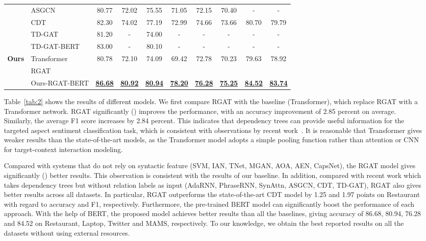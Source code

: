 \documentclass[journal]{IEEEtran}
\begin{document}
\begin{table*}
{{\begin{tabular}{llcccccccc}
					& ASGCN &80.77 &72.02 &75.55 &71.05 &72.15 &70.40 &{-} &{-} \\
					& CDT &82.30 &74.02 &77.19 &72.99 &74.66 &73.66 &{80.70} &{79.79} \\
					& TD-GAT &81.20 &- &74.00 &- &- &- &{-} &{-}\\
					& TD-GAT-BERT &83.00 &- &80.10 &- &- &- &{-} &{-}\\
					\midrule
					\multirow{3}{*}{\textbf{Ours}} & Transformer &80.78 &72.10 &74.09 &69.42 &72.78 &70.23&{79.63} &{78.92}\\
					& RGAT & & & & &  & &  & \\
					& Ours-RGAT-BERT &\underline{\textbf{86.68}} &\underline{\textbf{80.92}} &\underline{\textbf{80.94}} &\underline{\textbf{78.20}} &\underline{\textbf{76.28}} &\underline{\textbf{75.25}} &\underline{\textbf{{84.52}}} &\underline{\textbf{{83.74}}} \\
					\bottomrule
				\end{tabular}
			}
		}
\end{table*}
	Table~\ref{tab:2} shows the results of different models.
	We first compare RGAT with the baseline (Transformer), which replace RGAT with a Transformer network. 
	RGAT significantly () improves the performance, with an accuracy improvement of 2.85 percent on average.
	Similarly, the average F1 score increases by 2.84 percent. 
	This indicates that dependency trees can provide useful information for the targeted aspect sentiment classification task, which is consistent with observations by recent work~\cite{sun-etal-2019-aspect,huang-carley-2019-syntax}.
	It is reasonable that Transformer gives weaker results than the state-of-the-art models, as the Transformer model adopts a simple pooling function rather than attention or CNN for target-context interaction modeling.
	
	Compared with systems that do not rely on syntactic feature (SVM, IAN, TNet, MGAN, AOA, AEN, CapsNet), the RGAT model gives significantly () better results. 
	This observation is consistent with the results of our baseline.
	In addition, compared with recent work which takes dependency trees but without relation labels as input (AdaRNN, PhraseRNN, SynAttn, ASGCN, CDT, TD-GAT), 
	RGAT also gives better results across all datasets.
	In particular, RGAT outperforms the state-of-the-art CDT model by 1.25 and 1.97 points on Restaurant with regard to accuracy and F1, respectively.
	Furthermore, the pre-trained BERT model can significantly boost the performance of each approach. 
	With the help of BERT, the proposed model achieves better results than all the baselines, giving accuracy of 86.68, 80.94, 76.28 and 84.52 on Restaurant, Laptop, Twitter and MAMS, respectively. 
	To our knowledge, we obtain the best reported results on all the datasets without using external resources.
	
\end{document}
